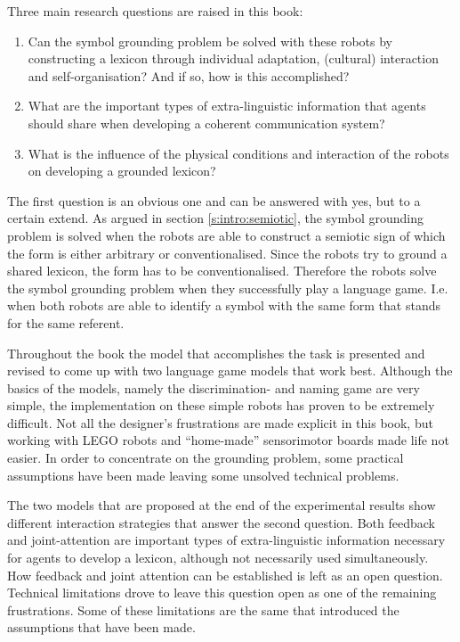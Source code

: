 Three main research questions are raised in this book:

\begin{enumerate}
\item Can the symbol grounding problem be solved with these robots by constructing a lexicon through individual adaptation, (cultural) interaction and self-organisation? And if so, how is this accomplished?
\item What are the important types of extra-linguistic information that agents should share when developing a coherent communication system?
\item What is the influence of the physical conditions and interaction of the robots on developing a grounded lexicon?
\end{enumerate}


The first question is an obvious one and can be answered with yes, but to a certain extend. As argued in section \ref{s:intro:semiotic}, the symbol grounding problem is solved when the robots are able to construct a semiotic sign of which the form is either arbitrary or conventionalised. Since the robots try to ground a shared lexicon, the form has to be conventionalised. Therefore the robots solve the symbol grounding problem when they successfully play a language game. I.e. when both robots are able to identify a symbol with the same form that stands for the same referent. 

Throughout the book the model that accomplishes the task is presented and revised to come up with two language game models that work best. Although the basics of the models, namely the discrimination- and naming game are very simple, the implementation on these simple robots has proven to be extremely difficult. Not all the designer's frustrations are made explicit in this book, but working with LEGO robots and ``home-made'' sensorimotor boards made life not easier. In order to concentrate on the grounding problem, some practical assumptions have been made leaving some unsolved technical problems. 

The two models that are proposed at the end of the experimental results show different interaction strategies that answer the second question. Both feedback and joint-attention are important types of extra-linguistic information necessary for agents to develop a lexicon, although not necessarily used simultaneously. How feedback and joint attention can be established is left as an open question. Technical limitations drove to leave this question open as one of the remaining frustrations. Some of these limitations are the same that introduced the assumptions that have been made. 


